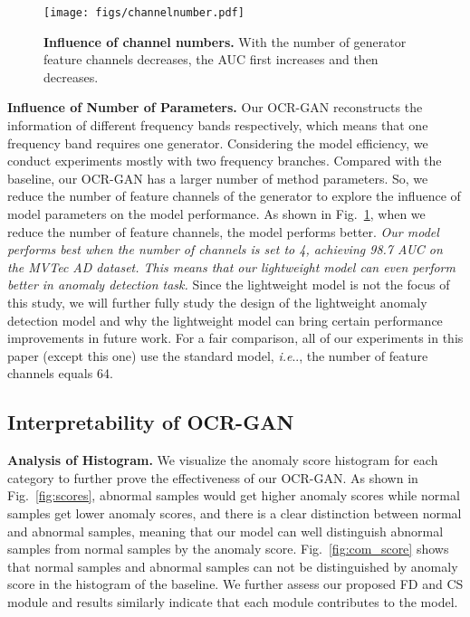 \documentclass[lettersize,journal]{IEEEtran}
\makeatletter
\DeclareRobustCommand\onedot{\futurelet\@let@token\@onedot}
\def\@onedot{\ifx\@let@token.\else.\null\fi\xspace}
\def\ie{\emph{i.e}\onedot} \def\Ie{\emph{I.e}\onedot}
\makeatother
\begin{document}
\begin{figure}[t]
	\centering
	\texttt{[image: figs/channelnumber.pdf]}
	\caption{\textbf{Influence of channel numbers.} With the number of generator feature channels decreases, the AUC first increases and then decreases.}
	\label{fig:channel}
\end{figure}

\noindent\textbf{Influence of Number of Parameters.} Our OCR-GAN reconstructs the information of different frequency bands respectively, which means that one frequency band requires one generator. Considering the model efficiency, we conduct experiments mostly with two frequency branches. Compared with the baseline, our OCR-GAN has a larger number of method parameters. So, we reduce the number of feature channels of the generator to explore the influence of model parameters on the model performance. As shown in Fig.~\ref{fig:channel}, when we reduce the number of feature channels, the model performs better. \emph{Our model performs best when the number of channels is set to 4, achieving 98.7 AUC on the MVTec AD dataset. This means that our lightweight model can even perform better in anomaly detection task.} Since the lightweight model is not the focus of this study, we will further fully study the design of the lightweight anomaly detection model and why the lightweight model can bring certain performance improvements in future work. For a fair comparison, all of our experiments in this paper (except this one) use the standard model, \ie, the number of feature channels equals 64. 

\subsection{Interpretability of OCR-GAN}
\noindent\textbf{Analysis of Histogram.}
We visualize the anomaly score histogram for each category to further prove the effectiveness of our OCR-GAN. As shown in Fig.~\ref{fig:scores}, abnormal samples would get higher anomaly scores while normal samples get lower anomaly scores, and there is a clear distinction between normal and abnormal samples, meaning that our model can well distinguish abnormal samples from normal samples by the anomaly score. Fig.~\ref{fig:com_score} shows that normal samples and abnormal samples can not be distinguished by anomaly score in the histogram of the baseline. We further assess our proposed FD and CS module and results similarly indicate that each module contributes to the model.
\end{document}
